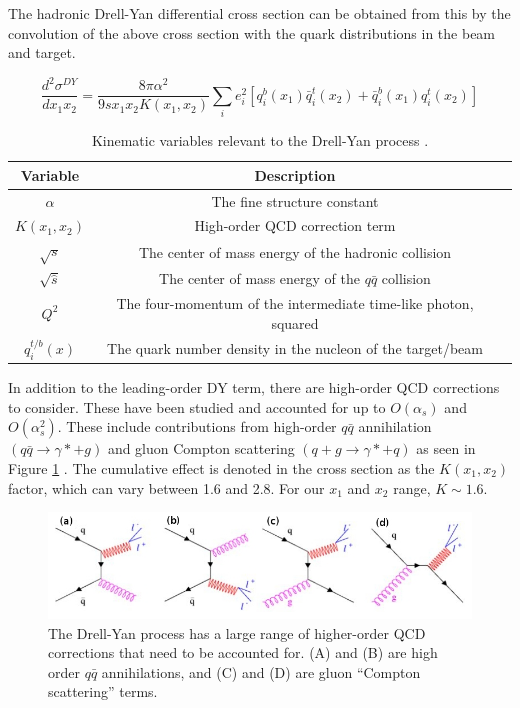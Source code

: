 The hadronic Drell-Yan differential cross section can be obtained from this by the convolution of the above cross section with the quark distributions in the beam and target.

\begin{equation}
\frac{d^2\sigma^{DY}}{dx_1x_2}=\frac{8\pi\alpha^2}{9sx_1x_2 K(x_1,x_2)}
\sum_{i}e_i^2[q_i^b(x_1)\bar{q}_i^t(x_2)+
\bar{q}_i^b(x_1)q_i^t(x_2)]
\label{eq:DY-cross2}
\end{equation}

\begin{table}[h]
	\centering
	\begin{tabular}{ccl}
		Variable&Description\\ \hline \hline
		$\alpha$ & The fine structure constant \\
		$K(x_1,x_2)$ & High-order QCD correction term \\ \hline
		$\sqrt{s}$ & The center of mass energy of the hadronic collision \\
		$\sqrt{\hat{s}}$ & The center of mass energy of the $q\bar{q}$ collision \\
		$Q^{2}$ & The four-momentum of the intermediate time-like photon, squared \\ 
		$q_i^{t/b}(x)$ & The quark number density in the nucleon of the target/beam \\ \hline \hline
	\end{tabular}
	\caption{Kinematic variables relevant to the Drell-Yan process .}
	\label{tab:var}
\end{table}


In addition to the leading-order DY term, there are high-order QCD corrections to consider. These have been studied and accounted for up to $O(\alpha_s)$ and $O(\alpha_s^2)$. These include contributions from high-order $q\bar{q}$ annihilation $(q \bar{q} \rightarrow \gamma * + g)$ and gluon Compton scattering $(q + g \rightarrow \gamma * + q)$ as seen in Figure \ref{fig:nlo-dy} \cite{duan-2007-50}. The cumulative effect is denoted in the cross section as the $K(x_1,x_2)$ factor, which can vary between 1.6 and 2.8.  For our $x_1$ and $x_2$ range, $K \sim 1.6$.

\begin{figure}[h]
	\centering
	\includegraphics[width=5.00in]{figures/background/DY.jpeg}
	\caption{The Drell-Yan process has a large range of higher-order QCD corrections that need to be accounted for. 
		(A) and (B) are high order $q\bar{q}$ annihilations, and (C) and (D) are gluon ``Compton scattering'' terms.}
	\label{fig:nlo-dy}
\end{figure}

